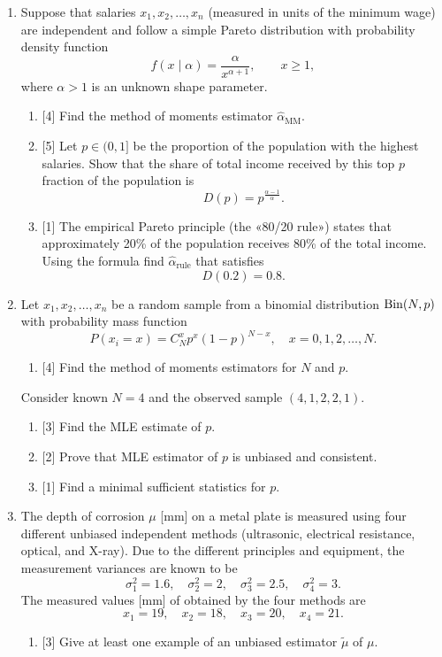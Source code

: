 \begin{enumerate}

\item Suppose that salaries \( x_1, x_2, \dots, x_n \) (measured in units of the minimum wage) are independent and follow a simple Pareto distribution with probability density function
\[
f(x \mid \alpha) = \frac{\alpha}{x^{\alpha+1}}, \qquad x \ge 1,
\]
where \( \alpha > 1 \) is an unknown shape parameter.

\begin{enumerate}
    \item {[4]} Find the method of moments estimator $\hat{\alpha}_{\text{MM}}$.

    \item {[5]}  Let $ p \in (0,1] $ be the proportion of the population with the highest salaries. 
    Show that the share of total income received by this top \( p \) fraction of the population is 
    \[
    D(p) = p^{\frac{\alpha-1}{\alpha}}.
    \]

    \item {[1]} The empirical Pareto principle (the «80/20 rule») states that approximately 20\% of the population receives 80\% of the total income. 
    Using the formula find $\hat{\alpha}_{\text{rule}}$ that satisfies
    \[
    D(0.2) = 0.8.
    \]
    
\end{enumerate}


\item  Let \( x_1, x_2, \dots, x_n \) be a random sample from a binomial distribution \( \mathrm{Bin}(N, p) \) with probability mass function
    \[
    P(x_i = x) = C_N^x p^x (1-p)^{N-x}, \quad x = 0, 1, 2, \ldots, N.
    \]    
    \begin{enumerate}
        \item {[4]} Find the method of moments estimators for $N$ and $p$.
    \end{enumerate}
    Consider known $N = 4$ and the observed sample \( (4, 1, 2, 2, 1) \).
    \begin{enumerate}[resume]
        \item {[3]} Find the MLE estimate of $p$.
        \item {[2]} Prove that MLE estimator of $p$ is unbiased and consistent.
        \item {[1]} Find a minimal sufficient statistics for $p$.
    \end{enumerate}

\item  The depth of corrosion $\mu$ [mm] on a metal plate is measured using four different unbiased independent methods (ultrasonic, electrical resistance, optical, and X-ray). 
    Due to the different principles and equipment, the measurement variances are known to be
    \[
    \sigma_1^2 = 1.6,\quad \sigma_2^2 = 2,\quad \sigma_3^2 = 2.5,\quad \sigma_4^2 = 3.
    \]
    The measured values [mm] of obtained by the four methods are
    \[
    x_1 = 19,\quad x_2 = 18,\quad x_3 = 20,\quad x_4 = 21.
    \]    
    \begin{enumerate}
        \item {[3]} Give at least one example of an unbiased estimator \( \tilde{\mu} \) of \(\mu\).


\end{enumerate}
\end{enumerate}
